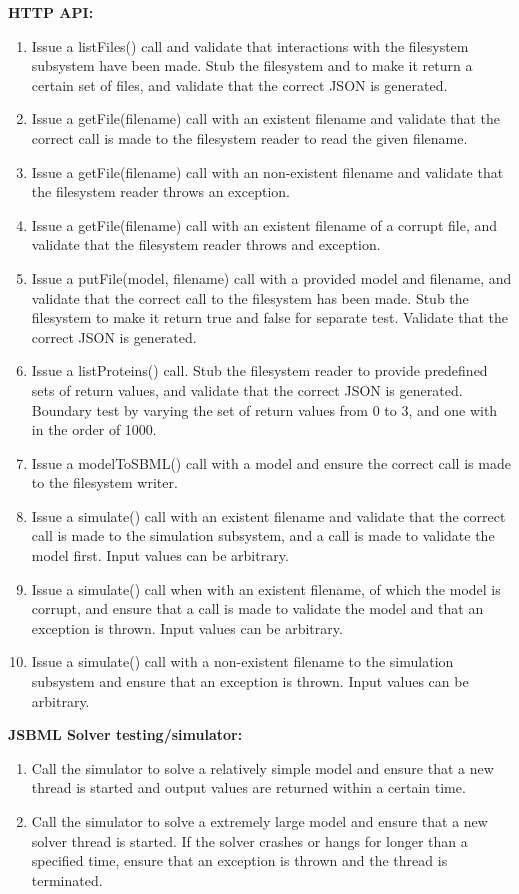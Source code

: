 \noindent \textbf{HTTP API:
}\begin{enumerate}
\item Issue a listFiles() call and validate that interactions with the filesystem subsystem have been made. Stub the filesystem and to make it return a certain set of files, and validate that the correct JSON is generated.
\item Issue a getFile(filename) call with an existent filename and validate that the correct call is made to the filesystem reader to read the given filename.
\item Issue a getFile(filename) call with an non-existent filename and validate that the filesystem reader throws an exception.
\item Issue a getFile(filename) call with an existent filename of a corrupt file, and validate that the filesystem reader throws and exception.
\item Issue a putFile(model, filename) call with a provided model and filename, and validate  that the correct call to the filesystem has been made. Stub the filesystem to make it return true and false for separate test. Validate that the correct JSON is generated.\item Issue a listProteins() call. Stub the filesystem reader to provide predefined sets of return values, and validate that the correct JSON is generated. Boundary test by varying the set of return values from 0 to 3, and one with in the order of 1000. \item Issue a modelToSBML() call with a model and ensure the correct call is made to the filesystem writer. \item Issue a simulate() call with an existent filename and validate that the correct call is made to the simulation subsystem, and a call is made to validate the model first. Input values can be arbitrary.
\item Issue a simulate() call when with an existent filename, of which the model is corrupt, and ensure that a call is made to validate the model and that an exception is thrown. Input values can be arbitrary.\item  Issue a simulate() call with a non-existent filename  to the simulation subsystem and ensure that an exception is thrown. Input values can be arbitrary.\end{enumerate}
\textbf{JSBML Solver testing/simulator:}
\begin{enumerate}
\item 
Call the simulator  to solve a relatively simple model and ensure that a new thread is started and output values are returned within a certain time.
\item Call the simulator to solve a extremely large model and ensure that a new solver thread is started. If the solver crashes or hangs for longer than a specified time, ensure that an exception is thrown and the thread is terminated.
\end{enumerate}
